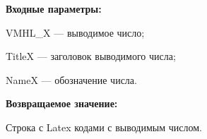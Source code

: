 \textbf{Входные параметры:}
 
    VMHL\_X --- выводимое число;
 
    TitleX --- заголовок выводимого числа;
 
    NameX --- обозначение числа.

\textbf{Возвращаемое значение:}

Строка с Latex кодами с выводимым числом.